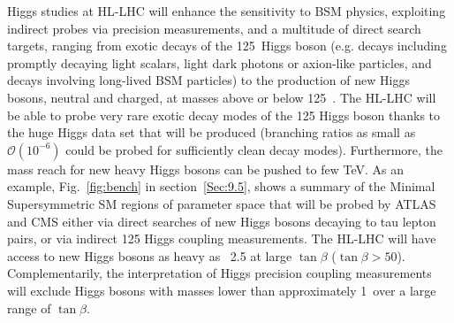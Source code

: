 \documentclass[../report.tex]{subfiles}
\begin{document}
Higgs studies at HL-LHC will enhance the sensitivity to BSM physics, exploiting indirect probes via precision measurements, and a multitude of direct search targets, ranging from exotic decays of the 125~\UGeV Higgs boson (e.g. decays including promptly decaying light scalars, light dark photons or axion-like particles, and decays involving long-lived BSM particles) to the production of new Higgs bosons, neutral and charged, at masses above or below 125~\UGeV.
The HL-LHC will be able to probe very rare exotic decay modes of the 125 \UGeV Higgs boson thanks to the huge Higgs data set that will be produced (branching ratios as small as $\mathcal O(10^{-6})$ could be probed for sufficiently clean decay modes). Furthermore, the mass reach for new heavy Higgs bosons can be pushed to few TeV. As an example, Fig.~\ref{fig:bench} in section~\ref{Sec:9.5}, shows a summary of the Minimal Supersymmetric SM regions of parameter space that will be probed by ATLAS and CMS either via direct searches of new Higgs bosons decaying to tau lepton pairs, or via indirect 125 \UGeV Higgs coupling measurements. The HL-LHC will have access to new Higgs bosons as heavy as ~2.5 \UTeV at large $\tan\beta$ ($\tan\beta>50$). Complementarily, the interpretation of Higgs precision coupling measurements will exclude Higgs bosons with masses lower than approximately 1~\UTeV over a large range of $\tan\beta$.
\end{document}
